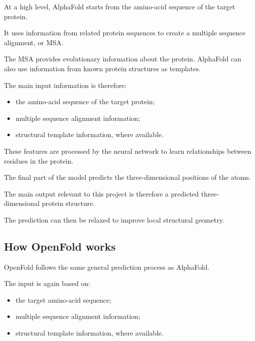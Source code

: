 \documentclass[11pt,a4paper]{article}
\begin{document}
At a high level, AlphaFold starts from the amino-acid sequence of the target protein.

It uses information from related protein sequences to create a multiple sequence alignment, or MSA.

The MSA provides evolutionary information about the protein. AlphaFold can also use information from known protein structures as templates.

The main input information is therefore:

\begin{itemize}[leftmargin=*]

    \item the amino-acid sequence of the target protein;

    \item multiple sequence alignment information;

    \item structural template information, where available.

\end{itemize}

These features are processed by the neural network to learn relationships between residues in the protein.

The final part of the model predicts the three-dimensional positions of the atoms.

The main output relevant to this project is therefore a predicted three-dimensional protein structure.

The prediction can then be relaxed to improve local structural geometry.


\subsection{How OpenFold works}

OpenFold follows the same general prediction process as AlphaFold.

The input is again based on:

\begin{itemize}[leftmargin=*]

    \item the target amino-acid sequence;

    \item multiple sequence alignment information;

    \item structural template information, where available.

\end{itemize}
\end{document}
